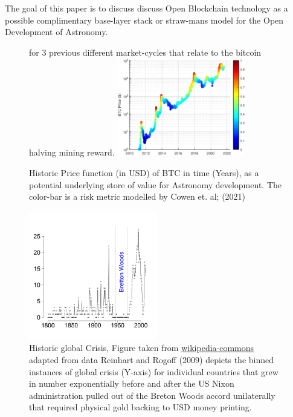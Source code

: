 \documentclass[final,5p,times,twocolumn,authoryear]{elsarticle}
\begin{document}
The goal of this paper is to discuss discuss Open Blockchain technology as a possible complimentary base-layer stack or straw-mans model for the Open Development of Astronomy.
 \begin{figure}[h!]
    \centering
    \label{fig:cowenbtc}
  \caption{Historic Price function (in USD) of BTC in time (Years), as a potential underlying store of value for Astronomy development. The color-bar is a risk metric modelled by Cowen et. al; (2021)} for 3 previous different market-cycles that relate to the bitcoin halving mining reward.
  \includegraphics[width=0.5\textwidth]{figs/cowenbtc.eps}
\end{figure}

\begin{figure}[h!]
    \centering
    \label{fig:crisis}
  \caption{Historic global Crisis, Figure taken from \href{https://en.wikipedia.org/wiki/Global_recession}{wikipedia-commons} adapted from data Reinhart and Rogoff (2009) depicts the binned instances of global crisis (Y-axis) for individual countries that grew in number exponentially before and after the US Nixon administration pulled out of the Breton Woods accord unilaterally that required physical gold backing to USD money printing.}
  \includegraphics[width=0.5\textwidth]{figs/330px-BankingCrises.svg.png}
\end{figure}
\end{document}
